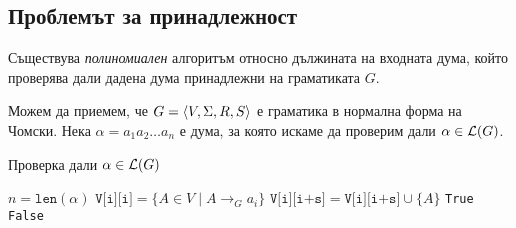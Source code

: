 \subsection{Проблемът за принадлежност}

\begin{thm}
  Съществува {\em полиномиален} алгоритъм относно дължината на входната дума, който проверява дали дадена дума принадлежни на граматиката $G$.
\end{thm}
Можем да приемем, че $G = \langle{V,\Sigma,R,S}\rangle$ е граматика в нормална форма на Чомски.
Нека $\alpha = a_1a_2\dots a_n$ е дума, за която искаме да проверим дали $\alpha \in \mathcal{L}(G)$.
\begin{algorithm}[H]
  \caption{Проверка дали $\alpha \in \mathcal{L}(G)$}
  \label{alg:belongs-to-grammar}
  \begin{algorithmic}[1]
    \State $n = \texttt{len}(\alpha)$ 
    \State $\texttt{V[i][i]} = \{A \in V \mid A\to_G a_i\}$ \label{alg:cyk:initial}
    \Else
    \EndIf
    \EndFor
    \ForAll{$s \in [1, n)$}  \label{alg:cyk:first-loop}
    \ForAll{$k \in [i, i + s)$}
    \State $\texttt{V[i][i+s]} = \texttt{V[i][i+s]} \cup \{A\}$ \label{alg:cyk:add-variable}
    \EndIf
    \EndFor
    \EndFor
    \EndFor
    \State \Return \texttt{True}
    \Else
    \State \Return \texttt{False}
    \EndIf
  \end{algorithmic}
\end{algorithm}


